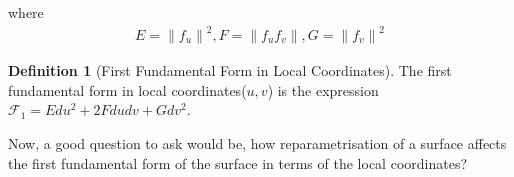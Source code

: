 \documentclass{article}
\theoremstyle{plain}
\theoremstyle{definition}
\newtheorem{definition}{Definition}
\theoremstyle{remark}
\begin{document}

where
\begin{align}
    E = \left\lVert f_u \right\rVert ^2, F = \left\lVert f_u f_v\right\rVert ,  G = \left\lVert
    f_v \right\rVert ^2
\end{align}

\begin{definition}[First Fundamental Form in Local Coordinates]
    The first fundamental form in local coordinates(\(u,v\)) is the expression \(\mathcal{F}_1 =  E du^2 + 2F du dv + G dv^2 \).
\end{definition}

Now, a good question to ask would be, how reparametrisation of a surface affects the first fundamental form of the surface in terms of the local coordinates?
\end{document}
